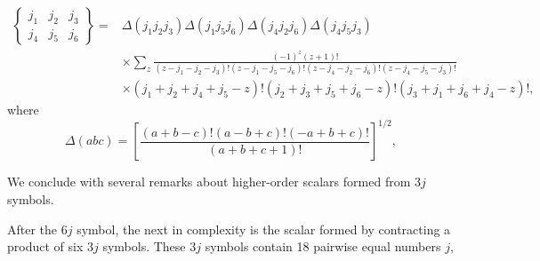 
\begingroup\footnotesize
\begin{equation}
\begin{aligned}
\left\{\begin{matrix}j_1&j_2&j_3\\j_4&j_5&j_6\end{matrix}\right\}
={}&\Delta(j_1j_2j_3)\Delta(j_1j_5j_6)\Delta(j_4j_2j_6)\Delta(j_4j_5j_3)\\
&\times\sum_z\frac{(-1)^z(z+1)!}{(z-j_1-j_2-j_3)!(z-j_1-j_5-j_6)!(z-j_4-j_2-j_6)!(z-j_4-j_5-j_3)!}\\
&\times(j_1+j_2+j_4+j_5-z)!(j_2+j_3+j_5+j_6-z)!(j_3+j_1+j_6+j_4-z)! ,
\end{aligned}
\tag{108.10}
\end{equation}
\endgroup
where
\[
\Delta(abc)=\left[\frac{(a+b-c)!(a-b+c)!(-a+b+c)!}{(a+b+c+1)!}\right]^{1/2},
\]


We conclude with several remarks about higher-order scalars formed from $3j$ symbols.

After the $6j$ symbol, the next in complexity is the scalar formed by contracting a product of six $3j$ symbols. These $3j$ symbols contain 18 pairwise equal numbers $j$,

